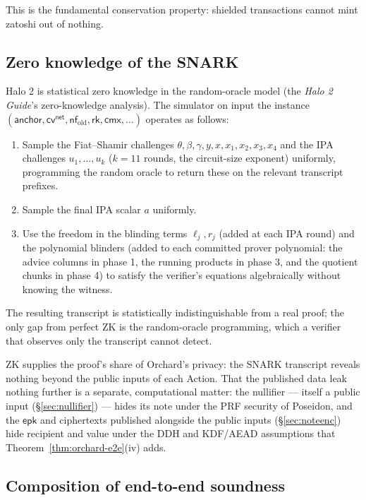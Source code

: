 \documentclass[11pt,a4paper]{article}
\theoremstyle{definition}
\newcommand{\nfsym}{\mathsf{nf}}
\newcommand{\cmx}{\mathsf{cmx}}
\newcommand{\cvsym}{\mathsf{cv}}
\newcommand{\rk}{\mathsf{rk}}
\begin{document}
This is the fundamental conservation property: shielded transactions
cannot mint zatoshi out of nothing.

\subsection{Zero knowledge of the SNARK}\label{sec:halo-zk}

Halo 2 is statistical zero knowledge in the random-oracle model
(the \emph{Halo 2 Guide}'s zero-knowledge analysis). The simulator on input the instance
$(\mathsf{anchor}, \cvsym^{\mathsf{net}}, \nfsym_{\mathrm{old}}, \rk, \cmx, \ldots)$
operates as follows:
\begin{enumerate}[leftmargin=*]
\item Sample the Fiat--Shamir challenges $\theta, \beta, \gamma, y, x, x_1, x_2, x_3, x_4$
and the IPA challenges $u_1, \dots, u_{k}$ ($k = 11$ rounds, the
circuit-size exponent) uniformly, programming the
random oracle to return these on the relevant transcript prefixes.
\item Sample the final IPA scalar $a$ uniformly.
\item Use the freedom in the blinding terms $\ell_j, r_j$ (added at each
IPA round) and the polynomial blinders (added to each committed prover
polynomial: the advice columns in phase 1, the running products in phase 3,
and the quotient chunks in phase 4) to satisfy
the verifier's equations algebraically without knowing the witness.
\end{enumerate}
The resulting transcript is statistically indistinguishable from a real
proof; the only gap from perfect ZK is the random-oracle programming,
which a verifier that observes only the transcript cannot detect.

ZK supplies the proof's share of Orchard's privacy: the SNARK transcript
reveals nothing beyond the public inputs of each Action. That the published
data leak nothing further is a separate, computational matter: the
nullifier --- itself a public input (\S\ref{sec:nullifier}) --- hides its
note under the PRF security of Poseidon, and the $\mathsf{epk}$ and
ciphertexts published alongside the public inputs (\S\ref{sec:noteenc})
hide recipient and value under the DDH and KDF/AEAD assumptions that
Theorem~\ref{thm:orchard-e2e}(iv) adds.

\subsection{Composition of end-to-end soundness}\label{sec:e2e-snd}
\end{document}
